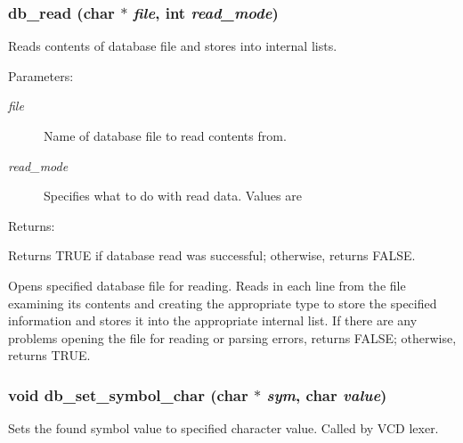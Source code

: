 \subsubsection{ db\_\-read (char $\ast$ {\em file}, int {\em read\_\-mode})}\label{db_8h_a1}


Reads contents of database file and stores into internal lists.

\begin{Desc}
\item[Parameters: ]\par
\begin{description}
\item[{\em 
file}]Name of database file to read contents from. \item[{\em 
read\_\-mode}]Specifies what to do with read data. Values are
\end{description}
\end{Desc}
\begin{Desc}
\item[Returns: ]\par
Returns TRUE if database read was successful; otherwise, returns FALSE.\end{Desc}
Opens specified database file for reading. Reads in each line from the file examining its contents and creating the appropriate type to store the specified information and stores it into the appropriate internal list. If there are any problems opening the file for reading or parsing errors, returns FALSE; otherwise, returns TRUE. 
\subsubsection{\setlength{\rightskip}{0pt plus 5cm}void db\_\-set\_\-symbol\_\-char (char $\ast$ {\em sym}, char {\em value})}\label{db_8h_a18}


Sets the found symbol value to specified character value. Called by VCD lexer.

